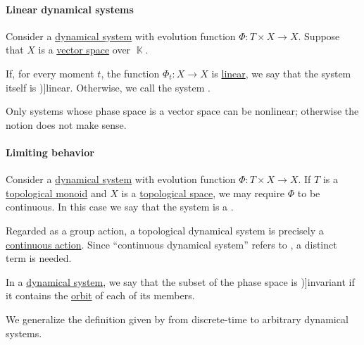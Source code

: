 \paragraph{Linear dynamical systems}

\begin{definition}\label{def:linear_dynamical_system}
  Consider a \hyperref[def:dynamical_system]{dynamical system} with evolution function \( \Phi: T \times X \to X \). Suppose that \( X \) is a \hyperref[def:vector_space]{vector space} over \( \BbbK \).

  If, for every moment \( t \), the function \( \Phi_t: X \to X \) is \hyperref[def:linear_function]{linear}, we say that the system itself is \term[ru=линейная (динамическая система) (\cite[11]{Юмагулов2015ДинамическиеСистемы})]{linear}. Otherwise, we call the system .
\end{definition}
\begin{comments}
  \item Only systems whose phase space is a vector space can be nonlinear; otherwise the notion does not make sense.
\end{comments}

\paragraph{Limiting behavior}

\begin{definition}\label{def:topological_dynamical_system}
  Consider a \hyperref[def:dynamical_system]{dynamical system} with evolution function \( \Phi: T \times X \to X \). If \( T \) is a \hyperref[def:topological_semigroup]{topological monoid} and \( X \) is a \hyperref[def:topological_space]{topological space}, we may require \( \Phi \) to be continuous. In this case we say that the system is a .
\end{definition}
\begin{comments}
  \item Regarded as a group action, a topological dynamical system is precisely a \hyperref[def:continuous_monoid_action]{continuous action}. Since \enquote{continuous dynamical system} refers to , a distinct term is needed.
\end{comments}

\begin{definition}\label{def:dynamical_system_invariant_set}
  In a \hyperref[def:dynamical_system]{dynamical system}, we say that the subset of the phase space is \term[ru=инвариантное множество (\cite[94]{Юмагулов2015ДинамическиеСистемы})]{invariant} if it contains the \hyperref[def:dynamical_system_trajectory]{orbit} of each of its members.
\end{definition}
\begin{comments}
  \item We generalize the definition given by  from discrete-time to arbitrary dynamical systems.
\end{comments}

